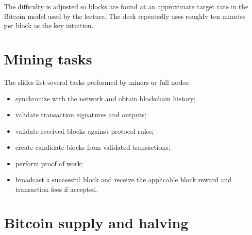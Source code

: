 \begin{mlfigure}
\end{mlfigure}

The difficulty is adjusted so blocks are found at an approximate target rate in the Bitcoin model used by the lecture. The deck repeatedly uses roughly ten minutes per block as the key intuition.

\section{Mining tasks}

The slides list several tasks performed by miners or full nodes:

\begin{itemize}
  \item synchronize with the network and obtain blockchain history;
  \item validate transaction signatures and outputs;
  \item validate received blocks against protocol rules;
  \item create candidate blocks from validated transactions;
  \item perform proof of work;
  \item broadcast a successful block and receive the applicable block reward and transaction fees if accepted.
\end{itemize}

\section{Bitcoin supply and halving}

